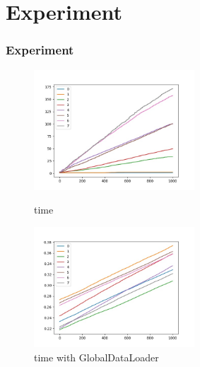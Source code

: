 \documentclass[notheorems, aspectratio=54]{beamer}
\begin{document}
\section{Experiment}
\begin{frame}
    \frametitle{Experiment}
    \begin{figure}[htbp]
        \centering
        \begin{minipage}[t]{0.48\textwidth}
        \centering
        \includegraphics[width=6cm]{global_img_dir/l.jpg}
        \caption{time}
        \end{minipage}
        \begin{minipage}[t]{0.48\textwidth}
        \centering
        \includegraphics[width=6cm]{global_img_dir/gl.jpg}
        \caption{time with GlobalDataLoader}
        \end{minipage}
    \end{figure}
\end{frame}
\end{document}
